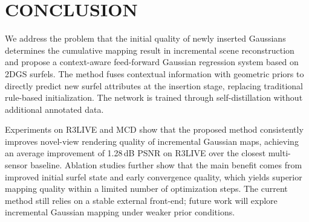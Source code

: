 \documentclass[letterpaper,journal]{IEEEtran}
\begin{document}
\section{CONCLUSION}

We address the problem that the initial quality of newly inserted Gaussians determines the cumulative mapping result in incremental scene reconstruction and propose a context-aware feed-forward Gaussian regression system based on 2DGS surfels. The method fuses contextual information with geometric priors to directly predict new surfel attributes at the insertion stage, replacing traditional rule-based initialization. The network is trained through self-distillation without additional annotated data.

Experiments on R3LIVE and MCD show that the proposed method consistently improves novel-view rendering quality of incremental Gaussian maps, achieving an average improvement of 1.28\,dB PSNR on R3LIVE over the closest multi-sensor baseline. Ablation studies further show that the main benefit comes from improved initial surfel state and early convergence quality, which yields superior mapping quality within a limited number of optimization steps. The current method still relies on a stable external front-end; future work will explore incremental Gaussian mapping under weaker prior conditions.





\end{document}
